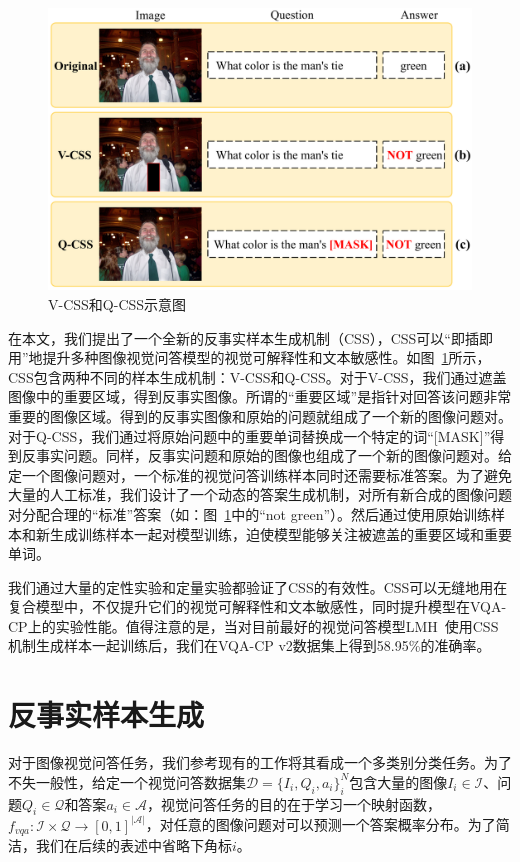 \begin{figure}[t]
    \centering
        \includegraphics[width=0.8\linewidth]{chapter7/res/V-CSS_Q-CSS.pdf}
    \caption{V-CSS和Q-CSS示意图}
    \label{ch7:fig:V-CSS_Q-CSS}
\end{figure}

在本文，我们提出了一个全新的反事实样本生成机制（CSS），CSS可以“即插即用”地提升多种图像视觉问答模型的视觉可解释性和文本敏感性。如图~\ref{ch7:fig:V-CSS_Q-CSS}所示，CSS包含两种不同的样本生成机制：V-CSS和Q-CSS。对于V-CSS，我们通过遮盖图像中的重要区域，得到反事实图像。所谓的“重要区域”是指针对回答该问题非常重要的图像区域。得到的反事实图像和原始的问题就组成了一个新的图像问题对。对于Q-CSS，我们通过将原始问题中的重要单词替换成一个特定的词“[MASK]”得到反事实问题。同样，反事实问题和原始的图像也组成了一个新的图像问题对。给定一个图像问题对，一个标准的视觉问答训练样本同时还需要标准答案。为了避免大量的人工标准，我们设计了一个动态的答案生成机制，对所有新合成的图像问题对分配合理的“标准”答案（如：图~\ref{ch7:fig:V-CSS_Q-CSS}中的“not green”）。然后通过使用原始训练样本和新生成训练样本一起对模型训练，迫使模型能够关注被遮盖的重要区域和重要单词。


我们通过大量的定性实验和定量实验都验证了CSS的有效性。CSS可以无缝地用在复合模型中，不仅提升它们的视觉可解释性和文本敏感性，同时提升模型在VQA-CP上的实验性能。值得注意的是，当对目前最好的视觉问答模型LMH~\cite{clark2019don}使用CSS机制生成样本一起训练后，我们在VQA-CP v2数据集上得到58.95\%的准确率。

\section{反事实样本生成}

对于图像视觉问答任务，我们参考现有的工作将其看成一个多类别分类任务。为了不失一般性，给定一个视觉问答数据集$\mathcal{D} = \{I_i, Q_i, a_i \}^N_i$包含大量的图像$I_i \in \mathcal{I}$、问题$Q_i \in \mathcal{Q}$和答案$a_i \in \mathcal{A}$，视觉问答任务的目的在于学习一个映射函数，$f_{vqa}: \mathcal{I} \times \mathcal{Q} \rightarrow [0, 1]^{|\mathcal{A}|}$，对任意的图像问题对可以预测一个答案概率分布。为了简洁，我们在后续的表述中省略下角标$i$。

